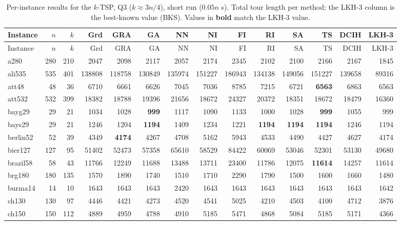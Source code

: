 {\footnotesize\setlength{\tabcolsep}{3pt}
\begin{longtable}{l r r r r r r r r r r r r r}
\caption{Per-instance results for the $k$-TSP, Q3 ($k\approx 3n/4$), short run ($0.05n$ s). Total tour length per method; the LKH-3 column is the best-known value (BKS). Values in \textbf{bold} match the LKH-3 value.}\label{tab:app_sr_large}\\
\hline Instance & $n$ & $k$ & Grd & GRA & GA & NN & NI & FI & RI & SA & TS & DCIH & LKH-3 \\ \hline \endfirsthead
\hline Instance & $n$ & $k$ & Grd & GRA & GA & NN & NI & FI & RI & SA & TS & DCIH & LKH-3 \\ \hline \endhead
\hline \endfoot
a280 & 280 & 210 & 2047 & 2098 & 2117 & 2057 & 2174 & 2345 & 2102 & 2100 & 2166 & 2167 & 1845 \\
ali535 & 535 & 401 & 138808 & 118758 & 130849 & 135974 & 151227 & 186943 & 134138 & 149056 & 151227 & 139658 & 89316 \\
att48 & 48 & 36 & 6710 & 6661 & 6626 & 7045 & 7036 & 8785 & 7215 & 6721 & \textbf{6563} & 6863 & 6563 \\
att532 & 532 & 399 & 18382 & 18788 & 19396 & 21656 & 18672 & 24327 & 20372 & 18351 & 18672 & 18479 & 16360 \\
bayg29 & 29 & 21 & 1034 & 1028 & \textbf{999} & 1117 & 1090 & 1133 & 1000 & 1028 & \textbf{999} & 1055 & 999 \\
bays29 & 29 & 21 & 1246 & 1204 & \textbf{1194} & 1409 & 1234 & 1221 & \textbf{1194} & \textbf{1194} & \textbf{1194} & 1246 & 1194 \\
berlin52 & 52 & 39 & 4349 & \textbf{4174} & 4267 & 4708 & 5162 & 5943 & 4533 & 4490 & 4427 & 4627 & 4174 \\
bier127 & 127 & 95 & 51402 & 52473 & 57358 & 65610 & 58529 & 84422 & 60069 & 53046 & 52301 & 53130 & 49680 \\
brazil58 & 58 & 43 & 11766 & 12249 & 11688 & 13488 & 13711 & 23400 & 11786 & 12075 & \textbf{11614} & 14257 & 11614 \\
brg180 & 180 & 135 & 1570 & 1890 & 1740 & 1510 & 1710 & 2290 & 1790 & 1500 & 1600 & 1660 & 1480 \\
burma14 & 14 & 10 & 1643 & 1643 & 1643 & 2420 & 1643 & 1643 & 1643 & 1643 & 1643 & 1643 & 1642 \\
ch130 & 130 & 97 & 4446 & 4421 & 4273 & 4520 & 4541 & 5025 & 4210 & 4503 & 4100 & 4712 & 3876 \\
ch150 & 150 & 112 & 4889 & 4959 & 4788 & 4910 & 5185 & 5471 & 4868 & 5084 & 5185 & 5171 & 4366 \\

\end{longtable}}

